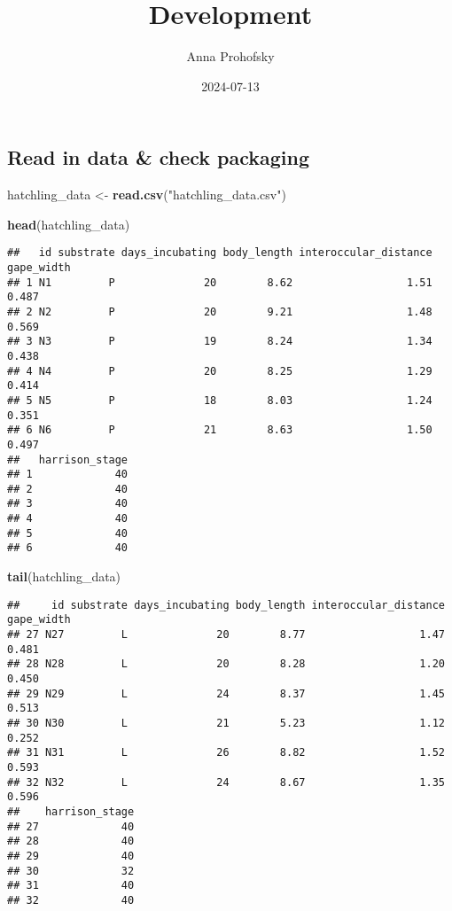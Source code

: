 \documentclass[
]{article}
\title{Development}
\author{Anna Prohofsky}
\date{2024-07-13}
\newenvironment{Shaded}{\begin{snugshade}}{\end{snugshade}}
\newcommand{\FunctionTok}[1]{\textcolor[rgb]{0.13,0.29,0.53}{\textbf{#1}}}
\newcommand{\NormalTok}[1]{#1}
\newcommand{\OtherTok}[1]{\textcolor[rgb]{0.56,0.35,0.01}{#1}}
\newcommand{\StringTok}[1]{\textcolor[rgb]{0.31,0.60,0.02}{#1}}
\begin{document}
\maketitle

\subsection{Read in data \& check
packaging}\label{read-in-data-check-packaging}

\begin{Shaded}
\begin{Highlighting}[]
\NormalTok{hatchling\_data }\OtherTok{\textless{}{-}} \FunctionTok{read.csv}\NormalTok{(}\StringTok{"hatchling\_data.csv"}\NormalTok{) }

\FunctionTok{head}\NormalTok{(hatchling\_data)}
\end{Highlighting}
\end{Shaded}

\begin{verbatim}
##   id substrate days_incubating body_length interoccular_distance gape_width
## 1 N1         P              20        8.62                  1.51      0.487
## 2 N2         P              20        9.21                  1.48      0.569
## 3 N3         P              19        8.24                  1.34      0.438
## 4 N4         P              20        8.25                  1.29      0.414
## 5 N5         P              18        8.03                  1.24      0.351
## 6 N6         P              21        8.63                  1.50      0.497
##   harrison_stage
## 1             40
## 2             40
## 3             40
## 4             40
## 5             40
## 6             40
\end{verbatim}

\begin{Shaded}
\begin{Highlighting}[]
\FunctionTok{tail}\NormalTok{(hatchling\_data)}
\end{Highlighting}
\end{Shaded}

\begin{verbatim}
##     id substrate days_incubating body_length interoccular_distance gape_width
## 27 N27         L              20        8.77                  1.47      0.481
## 28 N28         L              20        8.28                  1.20      0.450
## 29 N29         L              24        8.37                  1.45      0.513
## 30 N30         L              21        5.23                  1.12      0.252
## 31 N31         L              26        8.82                  1.52      0.593
## 32 N32         L              24        8.67                  1.35      0.596
##    harrison_stage
## 27             40
## 28             40
## 29             40
## 30             32
## 31             40
## 32             40
\end{verbatim}
\end{document}
